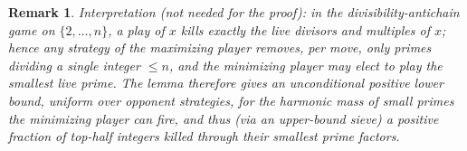 \documentclass{article}
\newtheorem{remark}{Remark}
\begin{document}
\begin{remark}
Interpretation (not needed for the proof): in the divisibility-antichain
game on $\{2,\dots,n\}$, a play of $x$ kills exactly the live divisors and
multiples of $x$; hence any strategy of the maximizing player removes, per
move, only primes dividing a single integer $\le n$, and the minimizing
player may elect to play the smallest live prime. The lemma therefore gives
an unconditional positive lower bound, uniform over opponent strategies,
for the harmonic mass of small primes the minimizing player can fire, and
thus (via an upper-bound sieve) a positive fraction of top-half integers
killed through their smallest prime factors.
\end{remark}
\end{document}
